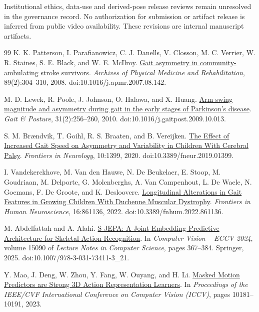 \documentclass{article}
\begin{document}
Institutional ethics, data-use and derived-pose release reviews remain unresolved in the governance record. No authorization for submission or artifact release is inferred from public video availability. These revisions are internal manuscript artifacts.
\label{physworld:main-last}
\clearpage
\label{physworld:references-start}
{\renewcommand{\bibfont}{\small}
\begin{thebibliography}{99}
 K. K. Patterson, I. Parafianowicz, C. J. Danells, V. Closson, M. C. Verrier, W. R. Staines, S. E. Black, and W. E. McIlroy. \href{https://pubmed.ncbi.nlm.nih.gov/18226655/}{Gait asymmetry in community-ambulating stroke survivors}. \emph{Archives of Physical Medicine and Rehabilitation}, 89(2):304--310, 2008. doi:10.1016/j.apmr.2007.08.142.

 M. D. Lewek, R. Poole, J. Johnson, O. Halawa, and X. Huang. \href{https://pubmed.ncbi.nlm.nih.gov/19945285/}{Arm swing magnitude and asymmetry during gait in the early stages of Parkinson's disease}. \emph{Gait \& Posture}, 31(2):256--260, 2010. doi:10.1016/j.gaitpost.2009.10.013.

 S. M. Brændvik, T. Goihl, R. S. Braaten, and B. Vereijken. \href{https://pubmed.ncbi.nlm.nih.gov/32082235/}{The Effect of Increased Gait Speed on Asymmetry and Variability in Children With Cerebral Palsy}. \emph{Frontiers in Neurology}, 10:1399, 2020. doi:10.3389/fneur.2019.01399.

 I. Vandekerckhove, M. Van den Hauwe, N. De Beukelaer, E. Stoop, M. Goudriaan, M. Delporte, G. Molenberghs, A. Van Campenhout, L. De Waele, N. Goemans, F. De Groote, and K. Desloovere. \href{https://pmc.ncbi.nlm.nih.gov/articles/PMC9201072/}{Longitudinal Alterations in Gait Features in Growing Children With Duchenne Muscular Dystrophy}. \emph{Frontiers in Human Neuroscience}, 16:861136, 2022. doi:10.3389/fnhum.2022.861136.

 M. Abdelfattah and A. Alahi. \href{https://www.ecva.net/papers/eccv_2024/papers_ECCV/papers/04755.pdf}{S-JEPA: A Joint Embedding Predictive Architecture for Skeletal Action Recognition}. In \emph{Computer Vision -- ECCV 2024}, volume 15090 of \emph{Lecture Notes in Computer Science}, pages 367--384. Springer, 2025. doi:10.1007/978-3-031-73411-3\_21.

 Y. Mao, J. Deng, W. Zhou, Y. Fang, W. Ouyang, and H. Li. \href{https://arxiv.org/abs/2308.07092}{Masked Motion Predictors are Strong 3D Action Representation Learners}. In \emph{Proceedings of the IEEE/CVF International Conference on Computer Vision (ICCV)}, pages 10181--10191, 2023.


\end{thebibliography}}
\end{document}
